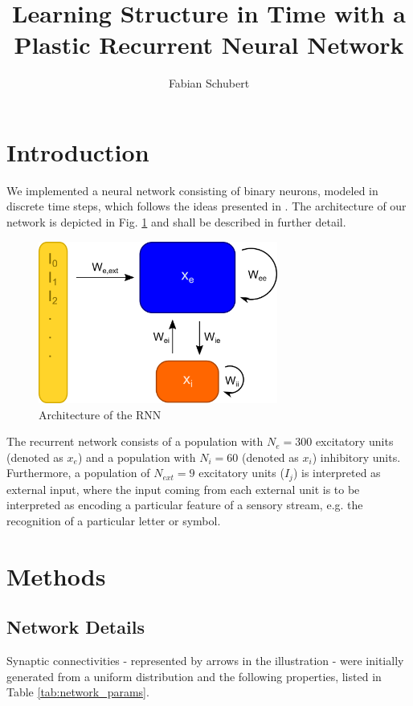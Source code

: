 \documentclass[10pt,a4paper]{article}
\title{Learning Structure in Time with a Plastic Recurrent Neural Network}
\author{Fabian Schubert}
\begin{document}
\maketitle
\section{Introduction}

We implemented a neural network consisting of binary neurons, modeled in discrete time steps, which follows the ideas presented in \cite{Duarte_2014}. The architecture of our network is depicted in Fig. \ref{fig:architecture} and shall be described in further detail.

\begin{figure}
\includegraphics[width=0.7\textwidth]{../../plots/illustration.png}
\caption{\label{fig:architecture} Architecture of the RNN}
\end{figure}

The recurrent network consists of a population with $N_e = 300$ excitatory units (denoted as $x_e$) and a population with $N_i = 60$ (denoted as $x_i$) inhibitory units. Furthermore, a population of $N_{ext} = 9$ excitatory units ($I_j$) is interpreted as external input, where the input coming from each external unit is to be interpreted as encoding a particular feature of a sensory stream, e.g. the recognition of a particular letter or symbol.

\section{Methods} \label{Methods}
\subsection{Network Details}

Synaptic connectivities - represented by arrows in the illustration - were initially generated from a uniform distribution and the following properties, listed in Table \ref{tab:network_params}.
\end{document}

